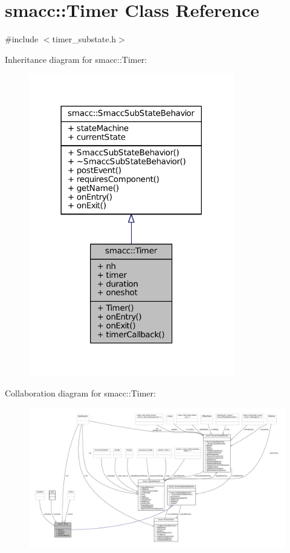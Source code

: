 \hypertarget{classsmacc_1_1Timer}{}\section{smacc\+:\+:Timer Class Reference}
\label{classsmacc_1_1Timer}


{\ttfamily \#include $<$timer\+\_\+substate.\+h$>$}



Inheritance diagram for smacc\+:\+:Timer\+:
\nopagebreak
\begin{figure}[H]
\begin{center}
\leavevmode
\includegraphics[width=254pt]{classsmacc_1_1Timer__inherit__graph}
\end{center}
\end{figure}


Collaboration diagram for smacc\+:\+:Timer\+:
\nopagebreak
\begin{figure}[H]
\begin{center}
\leavevmode
\includegraphics[width=350pt]{classsmacc_1_1Timer__coll__graph}
\end{center}
\end{figure}
